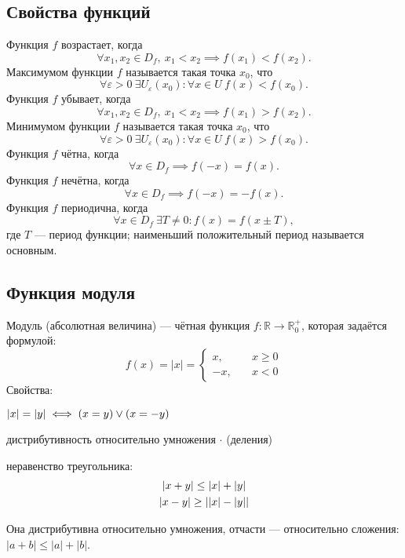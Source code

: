 \subsection{Свойства функций}

Функция $f$ {\ital возрастает}, когда
$$\forall x_1,x_2\in D_f,\ x_1\less x_2\implies f(x_1)\less f(x_2).$$
{\ital Максимумом} функции $f$ называется такая точка $x_0$, что
$$\forall\varepsilon\greater 0\ \exists U_\varepsilon(x_0)\colon\forall x\in U\ f(x)
\less f(x_0).$$
Функция $f$ {\ital убывает}, когда
$$\forall x_1,x_2\in D_f,\ x_1\less x_2\implies f(x_1)\greater f(x_2).$$
{\ital Минимумом} функции $f$ называется такая точка $x_0$, что
$$\forall\varepsilon\greater 0\ \exists U_\varepsilon(x_0)\colon\forall x\in U\ f(x)
\greater f(x_0).$$
Функция $f$ {\ital чётна}, когда
$$\forall x\in D_f\implies f(-x)=f(x).$$
Функция $f$ {\ital нечётна}, когда
$$\forall x\in D_f\implies f(-x)=-f(x).$$
Функция $f$ {\ital периодична}, когда
$$\forall x\in D_f\ \exists T\neq 0\colon f(x)=f(x\pm T),$$
где $T$ --- {\bold период} функции; наименьший положительный период называется
{\ital основным}.

\subsection{Функция модуля}

{\bold Модуль} {\ital (абсолютная величина)} --- чётная функция $f\colon\mathbb{R}
\to\mathbb{R}^+_0$, которая задаётся формулой:
$$f(x)=|x|=\begin{cases}x,\quad &x\geq 0\\-x,\quad &x\less 0\end{cases}$$
Свойства:
\begin{list*}
\item $\left|x\right|=\left|y\right|\iff (x=y)\lor(x=-y)$
\item дистрибутивность относительно {\ital умножения} $\cdot$ {\ital\color{desc} (деления)}
\item {\ital неравенство треугольника:}
$$\begin{gathered}
\left|x+y\right|\leq \left|x\right|+\left|y\right|\\
\left|x-y\right|\geq\left|\left|x\right|-\left|y\right|\right|
\end{gathered}$$
\end{list*}

Она {\ital дистрибутивна} относительно умножения, отчасти --- относительно
сложения: $|a+b|\leq |a|+|b|$.

